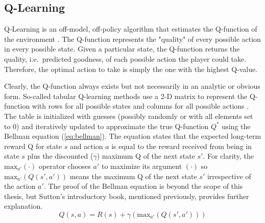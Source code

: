 \subsection{Q-Learning}
Q-Learning is an off-model, off-policy algorithm that estimates the Q-function of the environment \cite{sutton_2017}. The Q-function represents the "quality" of every possible action in every possible state. Given a particular state, the Q-function returns the quality, i.e.\ predicted goodness, of each possible action the player could take. Therefore, the optimal action to take is simply the one with the highest Q-value. 

Clearly, the Q-function always exists but not necessarily in an analytic or obvious form. So-called tabular Q-learning methods use a 2-D matrix to represent the Q-function with rows for all possible states and columns for all possible actions \cite{mccullock}. The table is initialized with guesses (possibly randomly or with all elements set to 0) and iteratively updated to approximate the true Q-function $Q^*$ using the Bellman equation (\ref{eq:bellman}). The equation states that the expected long-term reward Q for state $s$ and action $a$ is equal to the reward received from being in state $s$ plus the discounted ($\gamma$) maximum Q of the next state $s'$. For clarity, the $\text{max}_{a'}(\cdot)$ operator chooses $a'$ to maximize its argument $(\cdot)$ so $\text{max}_{a'}(Q(s',a'))$ means the maximum Q of the next state $s'$ irrespective of the action $a'$. The proof of the Bellman equation is beyond the scope of this thesis, but Sutton's introductory book, mentioned previously, provides further explanation.
\begin{equation}
	\label{eq:bellman}
	Q(s,a)=R(s) + \gamma (\text{max}_{a'}(Q(s',a')))
\end{equation}

